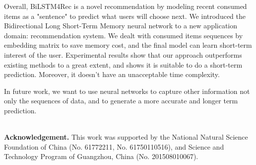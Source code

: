 \documentclass[runningheads]{llncs}
\begin{document}
Overall, BiLSTM4Rec is a novel recommendation by modeling recent consumed items as a "sentence" to predict what users will choose next. We introduced the Bidirectional Long Short-Term Memory neural network to a new application domain: recommendation system. We dealt with consumed items sequences by embedding matrix to save memory cost, and the final model can learn short-term interest of the user. Experimental results show that our approach outperforms existing methods to a great extent, and shows it is suitable to do a short-term prediction. Moreover, it doesn't have an unacceptable time complexity.

In future work, we want to use neural networks to capture other information not only the sequences of data, and to generate a more accurate and longer term prediction.

~\\
\textbf{Acknowledgement.} This work was supported by the National Natural Science Foundation of China (No. 61772211, No. 61750110516), and Science and Technology Program of Guangzhou, China (No. 201508010067).

%
%
%
% 
% 
%


\end{document}
